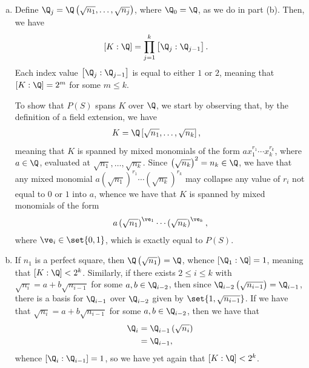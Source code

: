 \documentclass[10pt]{mypackage}
\begin{document}
\begin{solution}\hfill
  \begin{enumerate}[(a)]
    \item Define $\Q_j = \Q\left( \sqrt{n_1},\dots,\sqrt{n_j} \right)$, where $\Q_0 = \Q$, as we do in part (b). Then, we have
      \begin{align*}
        \left[ K:\Q \right] &= \prod_{j=1}^{k} \left[ \Q_j:\Q_{j-1} \right].
      \end{align*}
      Each index value $\left[ \Q_j:\Q_{j-1} \right]$ is equal to either $1$ or $2$, meaning that $\left[ K:\Q \right] = 2^{m}$ for some $m\leq k$.

      To show that $P(S)$ spans $K$ over $\Q$, we start by observing that, by the definition of a field extension, we have
      \begin{align*}
        K &= \Q\left[ \sqrt{n_1},\dots,\sqrt{n_k} \right],
      \end{align*}
      meaning that $K$ is spanned by mixed monomials of the form $ax_1^{r_1}\cdots x_k^{r_k}$, where $a\in \Q$, evaluated at $\sqrt{n_1},\dots,\sqrt{n_k}$. Since $\left( \sqrt{n_k} \right)^2= n_k\in \Q$, we have that any mixed monomial $a\left( \sqrt{n_1} \right)^{r_1}\cdots \left( \sqrt{n_k} \right)^{r_k}$ may collapse any value of $r_i$ not equal to $0$ or $1$ into $a$, whence we have that $K$ is spanned by mixed monomials of the form
      \begin{align*}
        a\left( \sqrt{n_1} \right)^{\ve_1}\cdots \left( \sqrt{n_k} \right)^{\ve_k},
      \end{align*}
      where $\ve_i \in \set{0,1}$, which is exactly equal to $P(S)$.
    \item If $n_1$ is a perfect square, then $\Q\left( \sqrt{n_1} \right) = \Q$, whence $\left[ \Q_1:\Q \right] = 1$, meaning that $\left[ K:\Q \right] < 2^{k}$. Similarly, if there exists $2\leq i \leq k$ with $\sqrt{n_i} = a + b\sqrt{n_{i-1}}$ for some $a,b\in \Q_{i-2}$, then since $\Q_{i-2}\left( \sqrt{n_{i-1}} \right) = \Q_{i-1}$, there is a basis for $\Q_{i-1}$ over $\Q_{i-2}$ given by $\set{1,\sqrt{n_{i-1}}}$. If we have that $\sqrt{n_i} = a + b\sqrt{n_{i-1}}$ for some $a,b\in \Q_{i-2}$, then we have that 
      \begin{align*}
        \Q_{i} &= \Q_{i-1}\left( \sqrt{n_i} \right)\\
               &= \Q_{i-1},
      \end{align*}
      whence $\left[ \Q_{i}:\Q_{i-1} \right] = 1$, so we have yet again that $\left[ K:\Q \right] < 2^{k}$.


\end{enumerate}
\end{solution}
\end{document}
